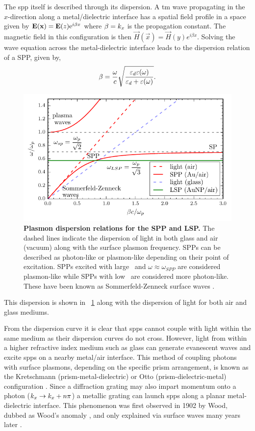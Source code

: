 \documentclass{article}
\begin{document}
The \gls{spp} itself is described through its dispersion. A \gls{tm} wave propagating in the $x$-direction along a metal/dielectric interface has a spatial field profile in a space  given by $\mathbf{E}(\mathbf{x}) = \mathbf{E}(z)\mathrm{e}^{i\beta x}$ where $\beta=k_x$ is the propagation constant. The magnetic field in this configuration is then $\vec{H}(\vec{x}) = \vec{H}(y)e^{i\beta x}$. Solving the wave equation across the metal-dielectric interface leads to the dispersion relation of a SPP, given by,
\begin{equation}
	\beta = \frac{\omega}{c}\sqrt{\frac{\varepsilon_d\varepsilon(\omega)}{\varepsilon_d + \varepsilon(\omega)}}.
	\label{eq:spp_dispersion}
\end{equation}
\begin{figure}[bt]
\centering
\includegraphics{figures/spp_dispersion}
\caption[Plasmon dispersion relations for the SPP and LSP]{\textbf{Plasmon dispersion relations for the SPP and LSP.} The dashed lines indicate the dispersion of light in both glass and air (vacuum) along with the surface plasmon frequency. SPPs can be described as photon-like or plasmon-like depending on their point of excitation. SPPs excited with large \wvm\ and $\omega\approx\omega_{SPP}$ are considered plasmon-like while SPPs with low \wvm\ are considered more photon-like. These have been known as Sommerfeld-Zenneck surface waves \cite{kittel1976introduction}.}
\label{fig:spp_dispersion}
\end{figure}
This dispersion is shown in \figurename~\ref{fig:spp_dispersion} along with the dispersion of light for both air and glass mediums.

From the dispersion curve it is clear that \glspl{spp} cannot couple with light within the same medium as their dispersion curves do not cross. However, light from within a higher refractive index medium such as glass can generate evanescent waves and excite \glspl{spp} on a nearby metal/air interface. This method of coupling photons with surface plasmons, depending on the specific prism arrangement, is known as the Kretschmann (prism-metal-dielectric) or Otto (prism-dielectric-metal) configuration \cite{otto1968, kretschmann1971}. Since a diffraction grating may also impart momentum onto a photon ($k_x \rightarrow k_x + n\pi$) a metallic grating can launch \glspl{spp} along a planar metal-dielectric interface. This phenomenon was first observed in 1902 by Wood, dubbed as Wood's anomaly \cite{wood1902}, and only explained via surface waves many years later \cite{fano1941}.
\end{document}
